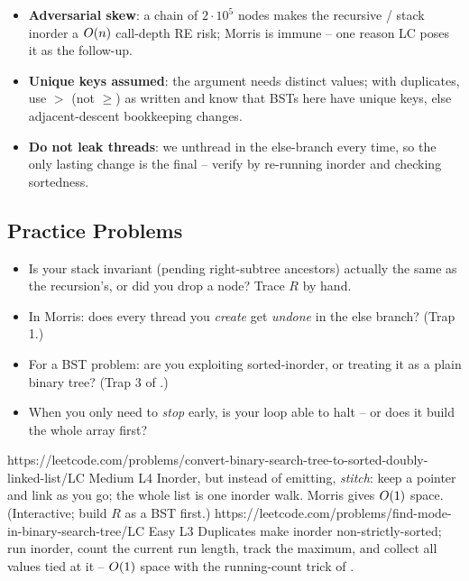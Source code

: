 \begin{hardeningbox}
\begin{itemize}[nosep, leftmargin=1.4em]
  \item \textbf{Adversarial skew}: a chain of $2\cdot10^{5}$ nodes makes the recursive /
        stack inorder a $O(n)$ call-depth \textsf{RE} risk; Morris is immune -- one
        reason LC poses it as the follow-up.
  \item \textbf{Unique keys assumed}: the argument needs distinct values; with duplicates,
        use $>$ (not $\ge$) as written and know that BSTs here have unique keys, else
        adjacent-descent bookkeeping changes.
  \item \textbf{Do not leak threads}: we unthread in the else-branch every time, so the
        only lasting change is the final  -- verify by re-running inorder and
        checking sortedness.
\end{itemize}
\end{hardeningbox}

\subsection{Practice Problems}

\begin{stuckbox}
\begin{itemize}[nosep, leftmargin=1.4em]
  \item Is your stack invariant (pending right-subtree ancestors) actually the same as
        the recursion's, or did you drop a node? Trace $R$ by hand.
  \item In Morris: does every thread you \emph{create} get \emph{undone} in the else
        branch? (Trap 1.)
  \item For a BST problem: are you exploiting sorted-inorder, or treating it as a plain
        binary tree? (Trap 3 of .)
  \item When you only need to \emph{stop} early, is your loop able to halt -- or does it
        build the whole array first?
\end{itemize}
\end{stuckbox}

\begin{practiceset}
    {https://leetcode.com/problems/convert-binary-search-tree-to-sorted-doubly-linked-list/}{LC Medium L4}
    {Inorder, but instead of emitting, \emph{stitch}: keep a  pointer and link
     as you go; the whole list is one inorder walk. Morris gives $O(1)$
    space. (Interactive; build $R$ as a BST first.)}
    {https://leetcode.com/problems/find-mode-in-binary-search-tree/}{LC Easy L3}
    {Duplicates make inorder non-strictly-sorted; run inorder, count the current run
    length, track the maximum, and collect all values tied at it -- $O(1)$ space with
    the running-count trick of .}
\end{practiceset}

